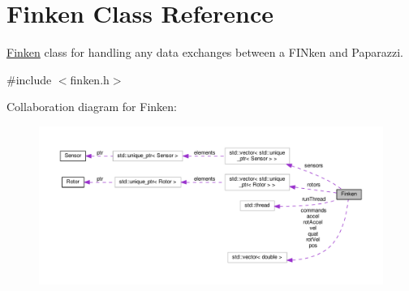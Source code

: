 \hypertarget{classFinken}{}\section{Finken Class Reference}
\label{classFinken}


\hyperlink{classFinken}{Finken} class for handling any data exchanges between a F\+I\+Nken and Paparazzi.  




{\ttfamily \#include $<$finken.\+h$>$}



Collaboration diagram for Finken\+:\nopagebreak
\begin{figure}[H]
\begin{center}
\leavevmode
\includegraphics[width=350pt]{classFinken__coll__graph}
\end{center}
\end{figure}
